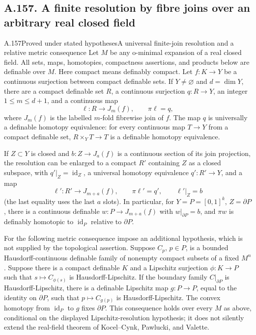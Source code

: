 \subsection{A.157. A finite resolution by fibre joins over an arbitrary real closed field}

\begin{saresult}{A.157}{Proved under stated hypotheses}{A universal finite-join resolution and a relative metric consequence}
Let \(M\) be any o-minimal expansion of a real closed field. All sets, maps, homotopies, compactness assertions, and products below are definable over \(M\). Here compact means definably compact. Let \(f:K\to Y\) be a continuous surjection between compact definable sets. If \(Y\ne\varnothing\) and \(d=\dim Y\), there are a compact definable set \(R\), a continuous surjection \(q:R\to Y\), an integer \(1\le m\le d+1\), and a continuous map
\[
 \ell:R\longrightarrow J_m(f),\qquad \pi\ell=q,
 \tag{157.1}
\]
where \(J_m(f)\) is the labelled \(m\)-fold fibrewise join of \(f\). The map \(q\) is universally a definable homotopy equivalence: for every continuous map \(T\to Y\) from a compact definable set, \(R\times_YT\to T\) is a definable homotopy equivalence.

If \(Z\subset Y\) is closed and \(b:Z\to J_a(f)\) is a continuous section of its join projection, the resolution can be enlarged to a compact \(R'\) containing \(Z\) as a closed subspace, with \(q'|_Z=\operatorname{id}_Z\), a universal homotopy equivalence \(q':R'\to Y\), and a map
\[
 \ell':R'\longrightarrow J_{m+a}(f),\qquad
 \pi\ell'=q',\qquad \ell'|_Z=b
 \tag{157.2}
\]
(the last equality uses the last \(a\) slots). In particular, for \(Y=P=[0,1]^k\), \(Z=\partial P\), there is a continuous definable \(w:P\to J_{m+a}(f)\) with \(w|_{\partial P}=b\), and \(\pi w\) is definably homotopic to \(\operatorname{id}_P\) relative to \(\partial P\).

For the following metric consequence impose an additional hypothesis, which is not supplied by the topological assertion. Suppose \(C_p\), \(p\in P\), is a bounded Hausdorff-continuous definable family of nonempty compact subsets of a fixed \(M^n\). Suppose there is a compact definable \(K\) and a Lipschitz surjection \(\phi:K\to P\) such that \(s\mapsto C_{\phi(s)}\) is Hausdorff-Lipschitz. If the boundary family \(C|_{\partial P}\) is Hausdorff-Lipschitz, there is a definable Lipschitz map \(g:P\to P\), equal to the identity on \(\partial P\), such that \(p\mapsto C_{g(p)}\) is Hausdorff-Lipschitz. The convex homotopy from \(\operatorname{id}_P\) to \(g\) fixes \(\partial P\). This consequence holds over every \(M\) as above, conditional on the displayed Lipschitz-resolution hypothesis; it does not silently extend the real-field theorem of Kocel--Cynk, Pawlucki, and Valette.
\end{saresult}

